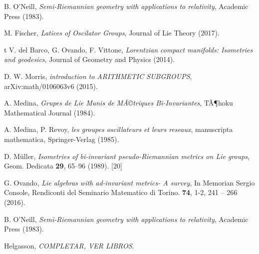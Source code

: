 \documentclass[11pt]{amsart}
\theoremstyle{plain}
\theoremstyle{definition}
\theoremstyle{remark}
\begin{document}
\begin{thebibliography}{GGGG}

 {\sc B. O'Neill}, {\it Semi-Riemannian geometry with
applications to relativity}, Academic Press (1983).

 {\sc M. Fischer}, {\it Latices of Oscilator Groups}, Journal of Lie Theory (2017).

t {\sc V. del Barco, \sc G. Ovando, \sc F. Vittone}, {\it Lorentzian compact manifolds: Isometries and geodesics}, Journal of Geometry and Physics (2014).


 {\sc D. W. Morris}, {\it introduction to ARITHMETIC SUBGROUPS}, arXiv:math/0106063v6 (2015).

 {\sc A. Medina}, {\it Grupes de Lie Munis de MÃ©triques Bi-Invariantes}, TÃ¶hoku Mathematical Journal (1984).

 {\sc A. Medina,  P. Revoy}, {\it les groupes oscillateurs et leurs reseaux}, manuscripta mathematica, Springer-Verlag (1985).

 {\sc D. M\"uller}, {\it Isometries of bi-invariant pseudo-Riemannian metrics on Lie groups},  Geom. Dedicata {\bf 29},  65--96 (1989).
[20]

 {\sc G. Ovando}, {\it Lie algebras with ad-invariant metrics- A survey}, In Memorian Sergio Console, Rendiconti del Seminario Matematico di Torino. {\bf  74}, 1-2, 241 -- 266 (2016).

 {\sc B. O'Neill}, {\it Semi-Riemannian geometry with
applications to relativity}, Academic Press (1983).

 {\sc Helgasson}, {\it COMPLETAR, VER LIBROS}.



\end{thebibliography}

\appendix 
\end{document}
